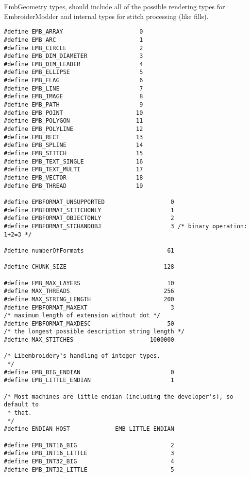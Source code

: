 EmbGeometry types, should include all of the possible rendering types
for EmbroiderModder and internal types for stitch processing (like
fills).

\begin{verbatim}
#define EMB_ARRAY                      0
#define EMB_ARC                        1
#define EMB_CIRCLE                     2
#define EMB_DIM_DIAMETER               3
#define EMB_DIM_LEADER                 4
#define EMB_ELLIPSE                    5
#define EMB_FLAG                       6
#define EMB_LINE                       7
#define EMB_IMAGE                      8
#define EMB_PATH                       9
#define EMB_POINT                     10
#define EMB_POLYGON                   11
#define EMB_POLYLINE                  12
#define EMB_RECT                      13
#define EMB_SPLINE                    14
#define EMB_STITCH                    15
#define EMB_TEXT_SINGLE               16
#define EMB_TEXT_MULTI                17
#define EMB_VECTOR                    18
#define EMB_THREAD                    19

#define EMBFORMAT_UNSUPPORTED                   0
#define EMBFORMAT_STITCHONLY                    1
#define EMBFORMAT_OBJECTONLY                    2
#define EMBFORMAT_STCHANDOBJ                    3 /* binary operation: 1+2=3 */

#define numberOfFormats                        61

#define CHUNK_SIZE                            128

#define EMB_MAX_LAYERS                         10
#define MAX_THREADS                           256
#define MAX_STRING_LENGTH                     200
#define EMBFORMAT_MAXEXT                        3
/* maximum length of extension without dot */
#define EMBFORMAT_MAXDESC                      50
/* the longest possible description string length */
#define MAX_STITCHES                      1000000

/* Libembroidery's handling of integer types.
 */
#define EMB_BIG_ENDIAN                          0
#define EMB_LITTLE_ENDIAN                       1

/* Most machines are little endian (including the developer's), so default to
 * that.
 */
#define ENDIAN_HOST             EMB_LITTLE_ENDIAN

#define EMB_INT16_BIG                           2
#define EMB_INT16_LITTLE                        3
#define EMB_INT32_BIG                           4
#define EMB_INT32_LITTLE                        5


\end{verbatim}

